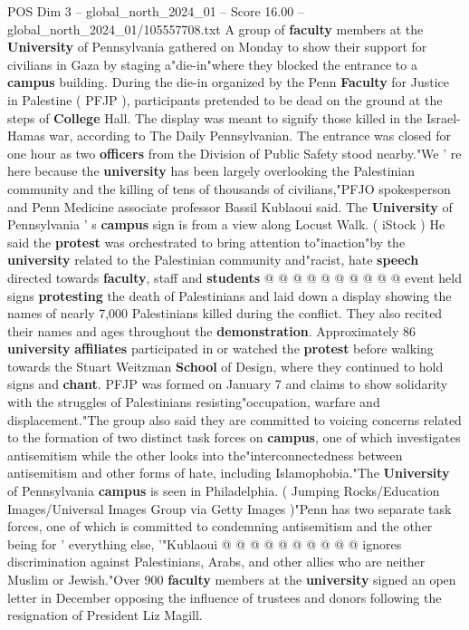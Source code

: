 \begin{textsample}{POS Dim 3 – global\_north\_2024\_01 – Score 16.00 – global\_north\_2024\_01/105557708.txt}  \label{ex:f3_pos_242}
A group of \textbf{faculty} members at the \textbf{University} of Pennsylvania gathered on Monday to show their support for civilians in Gaza by staging a"die-in"where they blocked the entrance to a \textbf{campus} building.
During the die-in organized by the Penn \textbf{Faculty} for Justice in Palestine ( PFJP ), participants pretended to be dead on the ground at the steps of \textbf{College} Hall.
The display was meant to signify those killed in the Israel-Hamas war, according to The Daily Pennsylvanian.
The entrance was closed for one hour as two \textbf{officers} from the Division of Public Safety stood nearby."We ' re here because the \textbf{university} has been largely overlooking the Palestinian community and the killing of tens of thousands of civilians,"PFJO spokesperson and Penn Medicine associate professor Bassil Kublaoui said.
The \textbf{University} of Pennsylvania ' s \textbf{campus} sign is from a view along Locust Walk. ( iStock ) He said the \textbf{protest} was orchestrated to bring attention to"inaction"by the \textbf{university} related to the Palestinian community and"racist, hate \textbf{speech} directed towards \textbf{faculty}, staff and \textbf{students} @ @ @ @ @ @ @ @ @ @ event held signs \textbf{protesting} the death of Palestinians and laid down a display showing the names of nearly 7,000 Palestinians killed during the conflict.
They also recited their names and ages throughout the \textbf{demonstration}.
Approximately 86 \textbf{university} \textbf{affiliates} participated in or watched the \textbf{protest} before walking towards the Stuart Weitzman \textbf{School} of Design, where they continued to hold signs and \textbf{chant}.
PFJP was formed on January 7 and claims to show solidarity with the struggles of Palestinians resisting"occupation, warfare and displacement."The group also said they are committed to voicing concerns related to the formation of two distinct task forces on \textbf{campus}, one of which investigates antisemitism while the other looks into the"interconnectedness between antisemitism and other forms of hate, including Islamophobia."The \textbf{University} of Pennsylvania \textbf{campus} is seen in Philadelphia. ( Jumping Rocks/Education Images/Universal Images Group via Getty Images )"Penn has two separate task forces, one of which is committed to condemning antisemitism and the other being for ' everything else, '"Kublaoui @ @ @ @ @ @ @ @ @ @ ignores discrimination against Palestinians, Arabs, and other allies who are neither Muslim or Jewish."Over 900 \textbf{faculty} members at the \textbf{university} signed an open letter in December opposing the influence of trustees and donors following the resignation of President Liz Magill.

\end{textsample}
